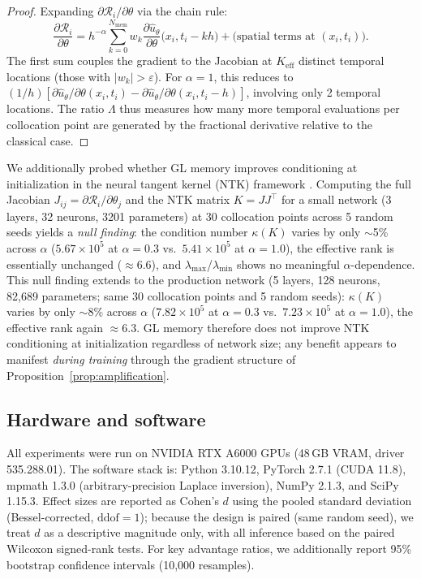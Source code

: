 \documentclass[11pt]{article}
\newcommand{\Rcal}{\mathcal{R}}
\begin{document}
\begin{proof}
Expanding $\partial \Rcal_i / \partial \theta$ via the chain rule:
\[
\frac{\partial \Rcal_i}{\partial \theta} = h^{-\alpha} \sum_{k=0}^{N_{\mathrm{mem}}} w_k \frac{\partial \hat{u}_\theta}{\partial \theta}\bigl(x_i, t_i - kh\bigr) + \text{(spatial terms at }(x_i, t_i)\text{)}.
\]
The first sum couples the gradient to the Jacobian at $K_{\mathrm{eff}}$ distinct temporal locations (those with $|w_k| > \varepsilon$). For $\alpha = 1$, this reduces to $(1/h)[\partial \hat{u}_\theta/\partial\theta(x_i,t_i) - \partial \hat{u}_\theta/\partial\theta(x_i,t_i-h)]$, involving only 2 temporal locations. The ratio $\Lambda$ thus measures how many more temporal evaluations per collocation point are generated by the fractional derivative relative to the classical case.
\end{proof}

We additionally probed whether GL memory improves conditioning at initialization in the neural tangent kernel (NTK) framework \cite{wang2022ntk}. Computing the full Jacobian $J_{ij} = \partial \Rcal_i/\partial\theta_j$ and the NTK matrix $K = JJ^\top$ for a small network (3 layers, 32 neurons, 3201 parameters) at 30 collocation points across 5 random seeds yields a \emph{null finding}: the condition number $\kappa(K)$ varies by only $\sim$5\% across $\alpha$ ($5.67 \times 10^5$ at $\alpha = 0.3$ vs.\ $5.41 \times 10^5$ at $\alpha = 1.0$), the effective rank is essentially unchanged ($\approx 6.6$), and $\lambda_{\max}$/$\lambda_{\min}$ shows no meaningful $\alpha$-dependence. This null finding extends to the production network (5 layers, 128 neurons, 82{,}689 parameters; same 30 collocation points and 5 random seeds): $\kappa(K)$ varies by only $\sim$8\% across $\alpha$ ($7.82 \times 10^5$ at $\alpha = 0.3$ vs.\ $7.23 \times 10^5$ at $\alpha = 1.0$), the effective rank again $\approx 6.3$. GL memory therefore does not improve NTK conditioning at initialization regardless of network size; any benefit appears to manifest \emph{during training} through the gradient structure of Proposition~\ref{prop:amplification}.

\subsection{Hardware and software}

All experiments were run on NVIDIA RTX A6000 GPUs (48\,GB VRAM, driver 535.288.01). The software stack is: Python 3.10.12, PyTorch 2.7.1 (CUDA 11.8), mpmath 1.3.0 (arbitrary-precision Laplace inversion), NumPy 2.1.3, and SciPy 1.15.3. Effect sizes are reported as Cohen's $d$ using the pooled standard deviation (Bessel-corrected, $\mathrm{ddof} = 1$); because the design is paired (same random seed), we treat $d$ as a descriptive magnitude only, with all inference based on the paired Wilcoxon signed-rank tests. For key advantage ratios, we additionally report 95\% bootstrap confidence intervals (10{,}000 resamples).
\end{document}
